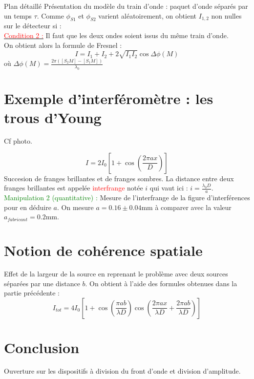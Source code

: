 \begin{reportBlock}{Plan détaillé}
  Présentation du modèle du train d'onde : paquet d'onde séparés par un temps $\tau$. Comme $\phi_{S1}$ et $\phi_{S2}$ varient aléatoirement, on obtient $I_{1,2}$ non nulles sur le détecteur si :\\
  \underline{\textcolor{red}{Condition 2 :}} Il faut que les deux ondes soient issus du même train d'onde. \\

  On obtient alors la formule de Fresnel :
  \begin{equation}
      I = I_1 + I_2 + 2\sqrt{I_1I_2}\cos{\Delta\phi(M)}  \end{equation}
      où $\Delta\phi(M) = \frac{2\pi([S_2M]-[S_1M])}{\lambda_0}$

\section{Exemple d'interféromètre : les trous d'Young}
Cf photo.

\begin{equation}
    I = 2I_0\left[1+\cos\left(\frac{2\pi ax}{D}\right)\right]
\end{equation}
Succesion de franges brillantes et de franges sombres. La distance entre deux franges brillantes est appelée \textcolor{red}{interfrange} notée $i$ qui vaut ici : $i=\frac{\lambda_0D}{a}$.\\
\textcolor{green}{Manipulation 2 (quantitative) :} Mesure de l'interfrange de la figure d'interférences pour en déduire $a$. On mesure $a=0.16\pm0.04$mm à comparer avec la valeur $a_{fabricant}=0.2$mm.

\section{Notion de cohérence spatiale}
Effet de la largeur de la source en reprenant le problème avec deux sources séparées par une distance $b$. On obtient à l'aide des formules obtenues dans la partie précédente : 
\begin{equation}
    I_{tot} = 4I_0\left[1+\cos\left(\frac{\pi ab}{\lambda D}\right)\cos\left(\frac{2\pi a x}{\lambda D}+\frac{2\pi a b}{\lambda D}\right)\right]
\end{equation}
\section{Conclusion}
Ouverture sur les dispositifs à division du front d'onde et division d'amplitude.
\end{reportBlock}


